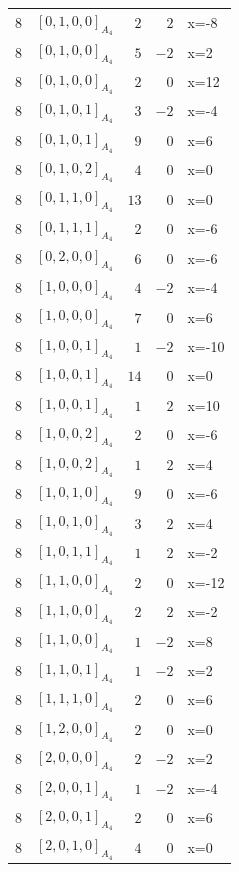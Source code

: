 \documentclass[11pt]{article}
\newcommand{\Dynkin}[1]{#1}
\begin{document}
\begin{longtable}{r l r r l}
8 & $\Dynkin{[0,1,0,0]_{A_4}}$ & $2$ & $2$ & x=-8\\
8 & $\Dynkin{[0,1,0,0]_{A_4}}$ & $5$ & $-2$ & x=2\\
8 & $\Dynkin{[0,1,0,0]_{A_4}}$ & $2$ & $0$ & x=12\\
8 & $\Dynkin{[0,1,0,1]_{A_4}}$ & $3$ & $-2$ & x=-4\\
8 & $\Dynkin{[0,1,0,1]_{A_4}}$ & $9$ & $0$ & x=6\\
8 & $\Dynkin{[0,1,0,2]_{A_4}}$ & $4$ & $0$ & x=0\\
8 & $\Dynkin{[0,1,1,0]_{A_4}}$ & $13$ & $0$ & x=0\\
8 & $\Dynkin{[0,1,1,1]_{A_4}}$ & $2$ & $0$ & x=-6\\
8 & $\Dynkin{[0,2,0,0]_{A_4}}$ & $6$ & $0$ & x=-6\\
8 & $\Dynkin{[1,0,0,0]_{A_4}}$ & $4$ & $-2$ & x=-4\\
8 & $\Dynkin{[1,0,0,0]_{A_4}}$ & $7$ & $0$ & x=6\\
8 & $\Dynkin{[1,0,0,1]_{A_4}}$ & $1$ & $-2$ & x=-10\\
8 & $\Dynkin{[1,0,0,1]_{A_4}}$ & $14$ & $0$ & x=0\\
8 & $\Dynkin{[1,0,0,1]_{A_4}}$ & $1$ & $2$ & x=10\\
8 & $\Dynkin{[1,0,0,2]_{A_4}}$ & $2$ & $0$ & x=-6\\
8 & $\Dynkin{[1,0,0,2]_{A_4}}$ & $1$ & $2$ & x=4\\
8 & $\Dynkin{[1,0,1,0]_{A_4}}$ & $9$ & $0$ & x=-6\\
8 & $\Dynkin{[1,0,1,0]_{A_4}}$ & $3$ & $2$ & x=4\\
8 & $\Dynkin{[1,0,1,1]_{A_4}}$ & $1$ & $2$ & x=-2\\
8 & $\Dynkin{[1,1,0,0]_{A_4}}$ & $2$ & $0$ & x=-12\\
8 & $\Dynkin{[1,1,0,0]_{A_4}}$ & $2$ & $2$ & x=-2\\
8 & $\Dynkin{[1,1,0,0]_{A_4}}$ & $1$ & $-2$ & x=8\\
8 & $\Dynkin{[1,1,0,1]_{A_4}}$ & $1$ & $-2$ & x=2\\
8 & $\Dynkin{[1,1,1,0]_{A_4}}$ & $2$ & $0$ & x=6\\
8 & $\Dynkin{[1,2,0,0]_{A_4}}$ & $2$ & $0$ & x=0\\
8 & $\Dynkin{[2,0,0,0]_{A_4}}$ & $2$ & $-2$ & x=2\\
8 & $\Dynkin{[2,0,0,1]_{A_4}}$ & $1$ & $-2$ & x=-4\\
8 & $\Dynkin{[2,0,0,1]_{A_4}}$ & $2$ & $0$ & x=6\\
8 & $\Dynkin{[2,0,1,0]_{A_4}}$ & $4$ & $0$ & x=0\\

\end{longtable}
\end{document}
